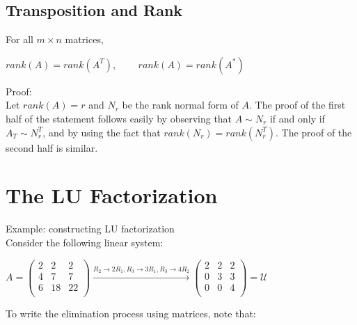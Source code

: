 \documentclass[UTF8,a4paper, 10pt, openany]{svmono}
\begin{document}
\subsection{Transposition and Rank}
For all $m\times n$ matrices,
\begin{center}
$rank(A)=rank(A^T)$, $\qquad rank(A)=rank(A^*)$
\end{center}
Proof: \\
Let $rank(A)=r$ and $N_r$ be the rank normal form of $A$. The proof of the first half of the statement follows easily by observing that $A\sim N_r$ if and only if $A_T\sim N_r^T$, and by using the fact that $rank(N_r)=rank(N_r^T)$. The proof of the second half is similar. 

\section{The LU Factorization}
Example: constructing LU factorization\\
Consider the following linear system:
\begin{center}
$A=
\begin{pmatrix}
2 & 2 & 2 \\
4 & 7 & 7 \\
6 & 18 & 22 \\
\end{pmatrix}
\xrightarrow[]{R_2\rightarrow 2R_1, R_3\rightarrow 3R_1, R_3\rightarrow 4R_2}
\begin{pmatrix}
2 & 2 & 2 \\
0 & 3 & 3 \\
0 & 0 & 4 \\
\end{pmatrix}=\mathcal{U}$
\end{center}
To write the elimination process using matrices, note that:
\end{document}
